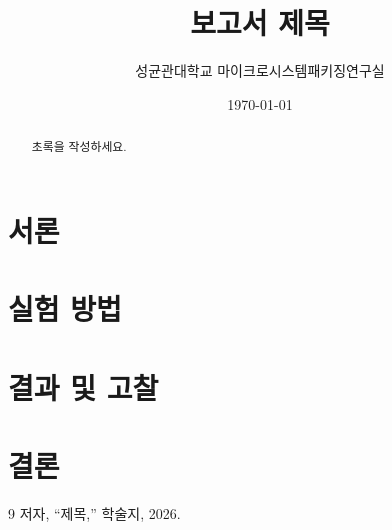 \documentclass[11pt,a4paper]{article}
\title{보고서 제목}
\author{성균관대학교 마이크로시스템패키징연구실}
\date{\today}
\begin{document}
\maketitle

\begin{abstract}
초록을 작성하세요.
\end{abstract}

\section{서론}

\section{실험 방법}

\section{결과 및 고찰}

\section{결론}

\begin{thebibliography}{9}
 저자, ``제목,'' 학술지, 2026.
\end{thebibliography}
\end{document}
